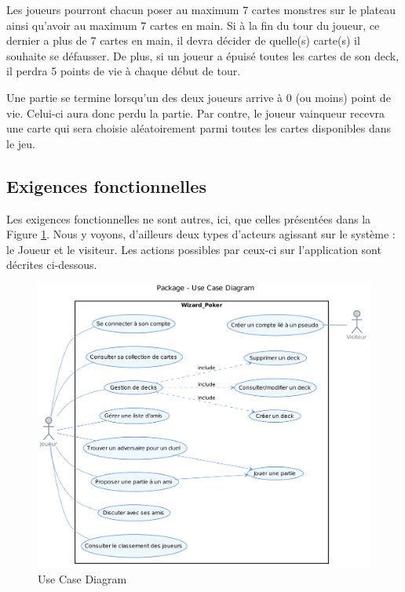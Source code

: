 \documentclass[11pt,a4paper]{article}
\begin{document}
\medbreak


Les joueurs pourront chacun poser au maximum 7 cartes monstres sur le plateau ainsi qu'avoir au maximum 7 cartes en main. Si à la fin du tour du joueur, ce dernier a plus de 7 cartes en main, il devra décider de quelle(s) carte(s) il souhaite se défausser. De plus, si un joueur a épuisé toutes les cartes de son deck, il perdra 5 points de vie à chaque début de tour.

\medbreak

Une partie se termine lorsqu'un des deux joueurs arrive à 0 (ou moins) point de vie.  Celui-ci aura donc perdu la partie.  Par contre, le joueur vainqueur recevra une carte qui sera choisie aléatoirement parmi toutes les cartes disponibles dans le jeu.


\subsection{Exigences fonctionnelles}

Les exigences fonctionnelles ne sont autres, ici, que celles présentées dans la Figure \ref{fig:usecasebesoin}. Nous y voyons, d'ailleurs deux types d'acteurs agissant sur le système : le Joueur et le \gls{visiteur}. Les actions possibles par ceux-ci sur l'application sont décrites ci-dessous.

\label{sec:exi-fonc}
\begin{figure}[ht]
  \centering
  \includegraphics[width=1\textwidth]{assets/uml/UseCaseDiagram.png}
  \caption{\label{fig:usecasebesoin} Use Case Diagram}
\end{figure}
\end{document}

